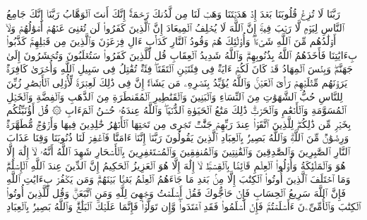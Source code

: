 \startbuffer[\q:3:8]
رَبَّنَا لَا تُزِغۡ قُلُوبَنَا بَعۡدَ إِذۡ هَدَیۡتَنَا وَهَبۡ لَنَا مِن لَّدُنكَ رَحۡمَةًۚ إِنَّكَ أَنتَ ٱلۡوَهَّابُ%
\stopbuffer
\startbuffer[\q:3:9]
رَبَّنَاۤ إِنَّكَ جَامِعُ ٱلنَّاسِ لِیَوۡمࣲ لَّا رَیۡبَ فِیهِۚ إِنَّ ٱللَّهَ لَا یُخۡلِفُ ٱلۡمِیعَادَ%
\stopbuffer
\startbuffer[\q:3:10]
إِنَّ ٱلَّذِینَ كَفَرُوا۟ لَن تُغۡنِیَ عَنۡهُمۡ أَمۡوَٰلُهُمۡ وَلَاۤ أَوۡلَٰدُهُم مِّنَ ٱللَّهِ شَیۡءࣰاۖ وَأُو۟لَٰۤئِكَ هُمۡ وَقُودُ ٱلنَّارِ%
\stopbuffer
\startbuffer[\q:3:11]
كَدَأۡبِ ءَالِ فِرۡعَوۡنَ وَٱلَّذِینَ مِن قَبۡلِهِمۡۚ كَذَّبُوا۟ بِءَایَٰتِنَا فَأَخَذَهُمُ ٱللَّهُ بِذُنُوبِهِمۡۗ وَٱللَّهُ شَدِیدُ ٱلۡعِقَابِ%
\stopbuffer
\startbuffer[\q:3:12]
قُل لِّلَّذِینَ كَفَرُوا۟ سَتُغۡلَبُونَ وَتُحۡشَرُونَ إِلَىٰ جَهَنَّمَۖ وَبِئۡسَ ٱلۡمِهَادُ%
\stopbuffer
\startbuffer[\q:3:13]
قَدۡ كَانَ لَكُمۡ ءَایَةࣱ فِی فِئَتَیۡنِ ٱلۡتَقَتَاۖ فِئَةࣱ تُقَٰتِلُ فِی سَبِیلِ ٱللَّهِ وَأُخۡرَىٰ كَافِرَةࣱ یَرَوۡنَهُم مِّثۡلَیۡهِمۡ رَأۡیَ ٱلۡعَیۡنِۚ وَٱللَّهُ یُؤَیِّدُ بِنَصۡرِهِۦ مَن یَشَاۤءُۚ إِنَّ فِی ذَٰلِكَ لَعِبۡرَةࣰ لِّأُو۟لِی ٱلۡأَبۡصَٰرِ%
\stopbuffer
\startbuffer[\q:3:14]
زُیِّنَ لِلنَّاسِ حُبُّ ٱلشَّهَوَٰتِ مِنَ ٱلنِّسَاۤءِ وَٱلۡبَنِینَ وَٱلۡقَنَٰطِیرِ ٱلۡمُقَنطَرَةِ مِنَ ٱلذَّهَبِ وَٱلۡفِضَّةِ وَٱلۡخَیۡلِ ٱلۡمُسَوَّمَةِ وَٱلۡأَنۡعَٰمِ وَٱلۡحَرۡثِۗ ذَٰلِكَ مَتَٰعُ ٱلۡحَیَوٰةِ ٱلدُّنۡیَاۖ وَٱللَّهُ عِندَهُۥ حُسۡنُ ٱلۡمَءَابِ%
\stopbuffer
\startbuffer[\q:3:15]
۞ قُلۡ أَؤُنَبِّئُكُم بِخَیۡرࣲ مِّن ذَٰلِكُمۡۖ لِلَّذِینَ ٱتَّقَوۡا۟ عِندَ رَبِّهِمۡ جَنَّٰتࣱ تَجۡرِی مِن تَحۡتِهَا ٱلۡأَنۡهَٰرُ خَٰلِدِینَ فِیهَا وَأَزۡوَٰجࣱ مُّطَهَّرَةࣱ وَرِضۡوَٰنࣱ مِّنَ ٱللَّهِۗ وَٱللَّهُ بَصِیرُۢ بِٱلۡعِبَادِ%
\stopbuffer
\startbuffer[\q:3:16]
ٱلَّذِینَ یَقُولُونَ رَبَّنَاۤ إِنَّنَاۤ ءَامَنَّا فَٱغۡفِرۡ لَنَا ذُنُوبَنَا وَقِنَا عَذَابَ ٱلنَّارِ%
\stopbuffer
\startbuffer[\q:3:17]
ٱلصَّٰبِرِینَ وَٱلصَّٰدِقِینَ وَٱلۡقَٰنِتِینَ وَٱلۡمُنفِقِینَ وَٱلۡمُسۡتَغۡفِرِینَ بِٱلۡأَسۡحَارِ%
\stopbuffer
\startbuffer[\q:3:18]
شَهِدَ ٱللَّهُ أَنَّهُۥ لَاۤ إِلَٰهَ إِلَّا هُوَ وَٱلۡمَلَٰۤئِكَةُ وَأُو۟لُوا۟ ٱلۡعِلۡمِ قَاۤئِمَۢا بِٱلۡقِسۡطِۚ لَاۤ إِلَٰهَ إِلَّا هُوَ ٱلۡعَزِیزُ ٱلۡحَكِیمُ%
\stopbuffer
\startbuffer[\q:3:19]
إِنَّ ٱلدِّینَ عِندَ ٱللَّهِ ٱلۡإِسۡلَٰمُۗ وَمَا ٱخۡتَلَفَ ٱلَّذِینَ أُوتُوا۟ ٱلۡكِتَٰبَ إِلَّا مِنۢ بَعۡدِ مَا جَاۤءَهُمُ ٱلۡعِلۡمُ بَغۡیَۢا بَیۡنَهُمۡۗ وَمَن یَكۡفُرۡ بِءَایَٰتِ ٱللَّهِ فَإِنَّ ٱللَّهَ سَرِیعُ ٱلۡحِسَابِ%
\stopbuffer
\startbuffer[\q:3:20]
فَإِنۡ حَاۤجُّوكَ فَقُلۡ أَسۡلَمۡتُ وَجۡهِیَ لِلَّهِ وَمَنِ ٱتَّبَعَنِۗ وَقُل لِّلَّذِینَ أُوتُوا۟ ٱلۡكِتَٰبَ وَٱلۡأُمِّیِّۦنَ ءَأَسۡلَمۡتُمۡۚ فَإِنۡ أَسۡلَمُوا۟ فَقَدِ ٱهۡتَدَوا۟ۖ وَّإِن تَوَلَّوۡا۟ فَإِنَّمَا عَلَیۡكَ ٱلۡبَلَٰغُۗ وَٱللَّهُ بَصِیرُۢ بِٱلۡعِبَادِ%
